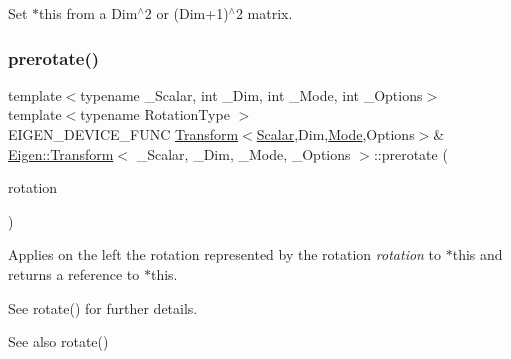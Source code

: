 Set {\ttfamily $\ast$this} from a Dim$^\wedge$2 or (Dim+1)$^\wedge$2 matrix. \mbox{\label{class_eigen_1_1_transform_a07c9c785fad5133485d4f4e6e2081593}} 
\subsubsection{\texorpdfstring{prerotate()}{prerotate()}}
{\footnotesize\ttfamily template$<$typename \+\_\+\+Scalar, int \+\_\+\+Dim, int \+\_\+\+Mode, int \+\_\+\+Options$>$ \\
template$<$typename Rotation\+Type $>$ \\
E\+I\+G\+E\+N\+\_\+\+D\+E\+V\+I\+C\+E\+\_\+\+F\+U\+NC \mbox{\hyperlink{class_eigen_1_1_transform}{Transform}}$<$\mbox{\hyperlink{class_eigen_1_1_transform_a4e69ced9d651745b8ed4eda46f41795d}{Scalar}},Dim,\mbox{\hyperlink{struct_mode}{Mode}},Options$>$\& \mbox{\hyperlink{class_eigen_1_1_transform}{Eigen\+::\+Transform}}$<$ \+\_\+\+Scalar, \+\_\+\+Dim, \+\_\+\+Mode, \+\_\+\+Options $>$\+::prerotate (\begin{DoxyParamCaption}\item[{const Rotation\+Type \&}]{rotation }\end{DoxyParamCaption})}

Applies on the left the rotation represented by the rotation {\itshape rotation} to {\ttfamily $\ast$this} and returns a reference to {\ttfamily $\ast$this}.

See rotate() for further details.

\begin{DoxySeeAlso}{See also}
rotate() 
\end{DoxySeeAlso}
\mbox{\label{class_eigen_1_1_transform_adcf0b66220d062523c0e3bc0f99a28b1}} 
